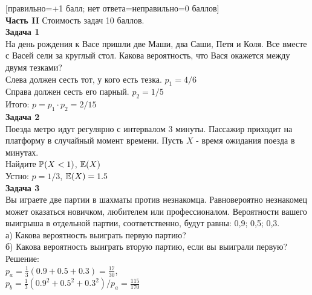 \documentclass[12pt, a4paper]{article}\usepackage[]{graphicx}\usepackage[]{color}
\begin{document}
$[$правильно=+1 балл; нет ответа=неправильно=0 баллов$]$ \\



\textbf{Часть II} Стоимость задач 10 баллов. \\


\textbf{Задача 1} \\ %
На день рождения к Васе пришли две Маши, два Саши, Петя и Коля. Все вместе с Васей сели за круглый стол. Какова вероятность, что Вася окажется между двумя тезками? \\
Слева должен сесть тот, у кого есть тезка. $p_{1}=4/6$\\
Справа должен сесть его парный. $p_{2}=1/5$ \\
Итого: $p=p_{1}\cdot p_{2}=2/15$ \\

\textbf{Задача 2} \\ %
Поезда метро идут регулярно с интервалом 3 минуты. Пассажир
приходит на платформу в случайный момент времени. Пусть $X$ -
время ожидания поезда в минутах. \\
Найдите $\P(X<1)$, $\E(X)$ \\
Устно: $p=1/3$, $\E(X)=1.5$ \\


\textbf{Задача 3} \\ %
Вы играете две партии в шахматы против незнакомца. Равновероятно
незнакомец может оказаться новичком, любителем или профессионалом.
Вероятности вашего выигрыша в отдельной партии, соответственно,
будут равны: 0,9; 0,5; 0,3. \\
а) Какова вероятность выиграть первую партию? \\
б) Какова вероятность выиграть вторую партию, если вы выиграли
первую? \\
Решение: \\
$p_{a}=\frac{1}{3}(0.9+0.5+0.3)=\frac{17}{30}$, \\
$p_{b}=\frac{1}{3}(0.9^{2}+0.5^{2}+0.3^{2})/p_{a}=\frac{115}{170}$ \\
\end{document}
